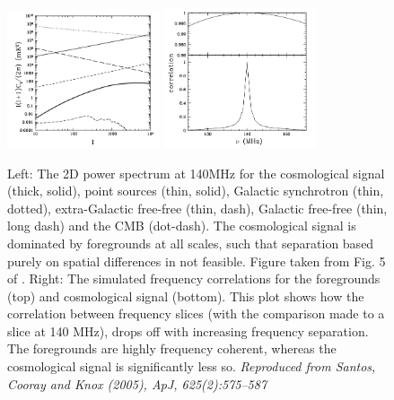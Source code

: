 \begin{figure}
\begin{center}
    \includegraphics[width=0.4\textwidth]{Chapman_Jelic/Images/santos_spat.png}
    \includegraphics[width=0.4\textwidth]{Chapman_Jelic/Images/santos_freq.png}
\end{center}
    \caption{Left: The 2D power spectrum at 140MHz for the cosmological signal (thick, solid), point sources (thin, solid), Galactic synchrotron (thin, dotted), extra-Galactic free-free (thin, dash), Galactic free-free (thin, long dash) and the CMB (dot-dash). The cosmological signal is dominated by foregrounds at all scales, such that separation based purely on spatial differences in not feasible. Figure taken from Fig. 5 of \cite{Santos2005ApJ...625..575S}. Right: The simulated frequency correlations for the foregrounds (top) and cosmological signal (bottom). This plot shows how the correlation between frequency slices (with the comparison made to a slice at 140 MHz), drops off with increasing frequency separation. The foregrounds are highly frequency coherent, whereas the cosmological signal is significantly less so. \textit{Reproduced from Santos, Cooray and Knox (2005), ApJ, 625(2):575–587}}
    \label{fig:santos_spatial}
\end{figure}

